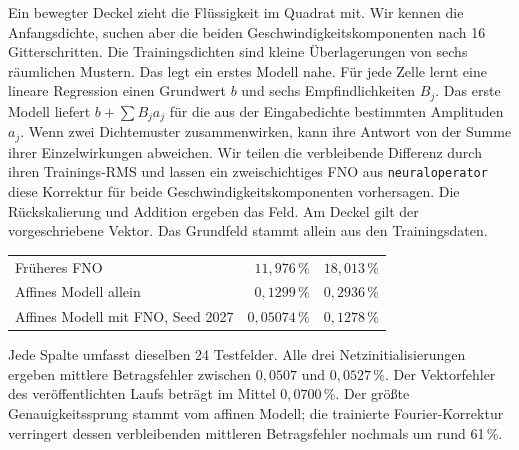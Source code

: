 Ein bewegter Deckel zieht die Flüssigkeit im Quadrat mit. Wir kennen die Anfangsdichte, suchen aber die beiden Geschwindigkeitskomponenten nach 16 Gitterschritten. Die Trainingsdichten sind kleine Überlagerungen von sechs räumlichen Mustern. Das legt ein erstes Modell nahe. Für jede Zelle lernt eine lineare Regression einen Grundwert \(b\) und sechs Empfindlichkeiten \(B_j\). Das erste Modell liefert \(b+\sum B_j a_j\) für die aus der Eingabedichte bestimmten Amplituden \(a_j\).
Wenn zwei Dichtemuster zusammenwirken, kann ihre Antwort von der Summe ihrer Einzelwirkungen abweichen. Wir teilen die verbleibende Differenz durch ihren Trainings-RMS und lassen ein zweischichtiges FNO aus \texttt{neuraloperator} diese Korrektur für beide Geschwindigkeitskomponenten vorhersagen. Die Rückskalierung und Addition ergeben das Feld. Am Deckel gilt der vorgeschriebene Vektor. Das Grundfeld stammt allein aus den Trainingsdaten.
{\tblstart\begin{tabularx}{\linewidth}{@{}Yrr@{}}\toprule
{}&&\\\midrule
Früheres FNO&\(11{,}976\,\%\)&\(18{,}013\,\%\)\\
Affines Modell allein&\(0{,}1299\,\%\)&\(0{,}2936\,\%\)\\
Affines Modell mit FNO, Seed 2027&\(0{,}05074\,\%\)&\(0{,}1278\,\%\)\\\bottomrule\end{tabularx}\par}
Jede Spalte umfasst dieselben 24 Testfelder. Alle drei Netzinitialisierungen ergeben mittlere Betragsfehler zwischen \(0{,}0507\) und \(0{,}0527\,\%\). Der Vektorfehler des veröffentlichten Laufs beträgt im Mittel \(0{,}0700\,\%\). Der größte Genauigkeitssprung stammt vom affinen Modell; die trainierte Fourier-Korrektur verringert dessen verbleibenden mittleren Betragsfehler nochmals um rund 61\,\%.

